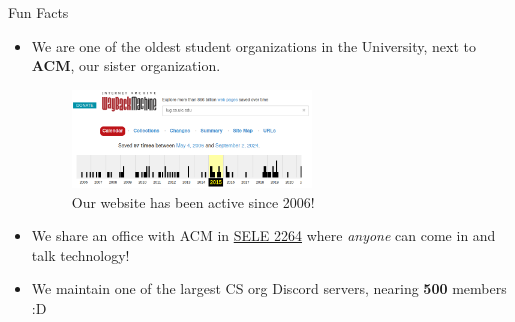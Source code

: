 \documentclass{beamer}
\begin{document}
\begin{frame}{Fun Facts}
	\begin{itemize}
		\item We are one of the oldest student organizations in the University,
			next to \textbf{ACM}, our sister organization.
			\pause
			\begin{figure}
				\centering
				\includegraphics[width=0.60\textwidth]{site_history.png}
				\caption{Our website has been active since 2006!}
			\end{figure}
			\pause
		\item We share an office with ACM in \underline{SELE 2264}
			where \textit{anyone} can come in and talk technology!
			\pause
		\item We maintain one of the largest CS org Discord servers,
			nearing \textbf{500} members :D
	\end{itemize}
\end{frame}
\end{document}
